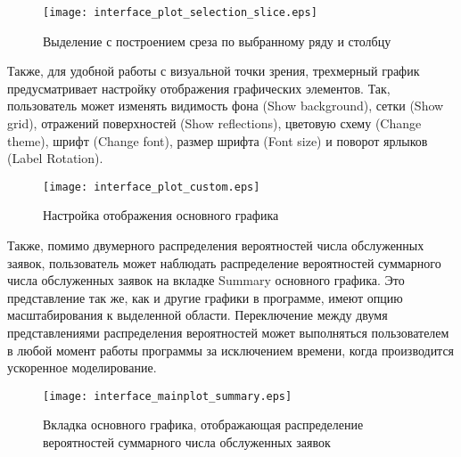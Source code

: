 \begin{figure}[H]
	\centering
	\texttt{[image: interface\_plot\_selection\_slice.eps]}
	\caption{Выделение с построением среза по выбранному ряду и столбцу}
	\label{interface_plot_selection_slice}
\end{figure}
Также, для удобной работы с визуальной точки зрения, трехмерный график предусматривает настройку отображения графических элементов. Так, пользователь может изменять видимость фона (Show background), сетки (Show grid), отражений поверхностей (Show reflections), цветовую схему (Change theme), шрифт (Change font), размер шрифта (Font size) и поворот ярлыков (Label Rotation). 

\begin{figure}[H]
	\centering
	\texttt{[image: interface\_plot\_custom.eps]}
	\caption{Настройка отображения основного графика}
	\label{interface_plot_custom}
\end{figure}

Также, помимо двумерного распределения вероятностей числа обслуженных заявок, пользователь может наблюдать распределение вероятностей суммарного числа обслуженных заявок на вкладке Summary основного графика. Это представление так же, как и другие графики в программе, имеют опцию масштабирования к выделенной области. Переключение между двумя представлениями распределения вероятностей может выполняться пользователем в любой момент работы программы за исключением времени, когда производится ускоренное моделирование. 
\begin{figure}[H]
	\centering
	\texttt{[image: interface\_mainplot\_summary.eps]}
	\caption{Вкладка основного графика, отображающая распределение вероятностей суммарного числа обслуженных заявок}
	\label{interface_mainplot_summary}
\end{figure}
